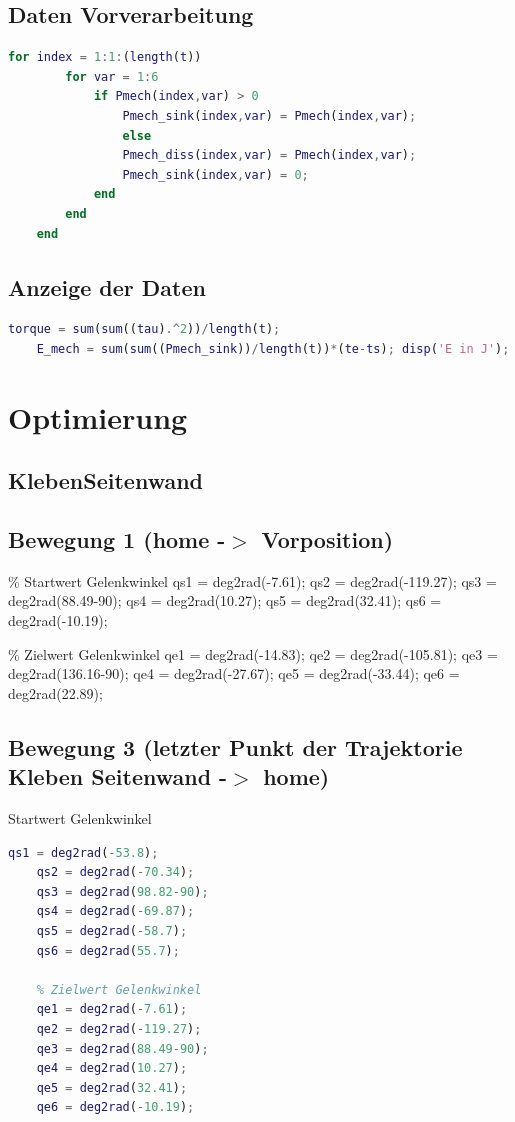 \subsection{Daten Vorverarbeitung}
%
\begin{lstlisting}[language=Matlab, numbers=none]
	for index = 1:1:(length(t))
		for var = 1:6
			if Pmech(index,var) > 0
				Pmech_sink(index,var) = Pmech(index,var);
				else
				Pmech_diss(index,var) = Pmech(index,var);
				Pmech_sink(index,var) = 0;
			end
		end
	end
\end{lstlisting}
%
\subsection{Anzeige der Daten}
%
\begin{lstlisting}[language=Matlab, numbers=none]
	torque = sum(sum((tau).^2))/length(t);
	E_mech = sum(sum((Pmech_sink))/length(t))*(te-ts); disp('E in J'); disp(E_mech);
\end{lstlisting}
%
%
\section{Optimierung}
\label{add:optimierer}
%
\subsection{KlebenSeitenwand}
%
\subsection{Bewegung 1 (home -\ensuremath{>} Vorposition)}
%
\begin{par}
	\% Startwert Gelenkwinkel qs1 = deg2rad(-7.61); qs2 = deg2rad(-119.27); qs3 = deg2rad(88.49-90); qs4 = deg2rad(10.27); qs5 = deg2rad(32.41); qs6 = deg2rad(-10.19);
\end{par} \vspace{1em}
\begin{par}
	\% Zielwert Gelenkwinkel qe1 = deg2rad(-14.83); qe2 = deg2rad(-105.81); qe3 = deg2rad(136.16-90); qe4 = deg2rad(-27.67); qe5 = deg2rad(-33.44); qe6 = deg2rad(22.89);
\end{par} \vspace{1em}
%
\subsection{Bewegung 3 (letzter Punkt der Trajektorie Kleben Seitenwand -\ensuremath{>} home)}
%
\begin{par}
	Startwert Gelenkwinkel
\end{par} \vspace{1em}
\begin{lstlisting}[language=Matlab, numbers=none]
	qs1 = deg2rad(-53.8);
	qs2 = deg2rad(-70.34);
	qs3 = deg2rad(98.82-90);
	qs4 = deg2rad(-69.87);
	qs5 = deg2rad(-58.7);
	qs6 = deg2rad(55.7);
	
	% Zielwert Gelenkwinkel
	qe1 = deg2rad(-7.61);
	qe2 = deg2rad(-119.27);
	qe3 = deg2rad(88.49-90);
	qe4 = deg2rad(10.27);
	qe5 = deg2rad(32.41);
	qe6 = deg2rad(-10.19);
\end{lstlisting}
%
